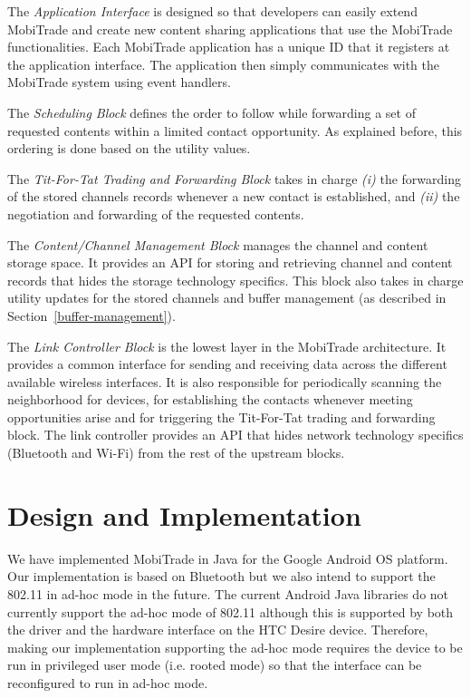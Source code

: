 The \textit{Application Interface} is designed so that developers can easily extend MobiTrade and create new content sharing applications that use the MobiTrade functionalities. Each MobiTrade application has a unique ID that it registers at the application interface. The application then simply communicates with the MobiTrade system using event handlers.

The \textit{Scheduling Block} defines the order to follow while forwarding a set of requested contents within a limited contact opportunity. As explained before, this ordering is done based on the utility values.

The \textit{Tit-For-Tat Trading and Forwarding Block} takes in charge \emph{(i)} the forwarding of the stored channels records whenever a new contact is established, and \emph{(ii)} the negotiation and forwarding of the requested contents.

The \textit{Content/Channel Management Block} manages the channel and content storage space. It provides an API for storing and retrieving channel and content records that hides the storage technology specifics. This block also takes in charge utility updates for the stored channels and buffer management (as described in Section~\ref{buffer-management}).

The \textit{Link Controller Block} is the lowest layer in the MobiTrade architecture. It provides a common interface for sending and receiving data across the different available wireless interfaces. It is also responsible for periodically scanning the neighborhood for devices, for establishing the contacts whenever meeting opportunities arise and for triggering the Tit-For-Tat trading and forwarding block. The link controller provides an API that hides network technology specifics (Bluetooth and Wi-Fi) from the rest of the upstream blocks.


\section{Design and Implementation}
\label{MobiTradeDesignAndImplementation}

We have implemented MobiTrade in Java for the Google Android OS platform. Our implementation is based on Bluetooth but we also intend to support the 802.11 in ad-hoc mode in the future. The current Android Java libraries do not currently support the ad-hoc mode of 802.11 although this is supported by both the driver and the hardware interface on the HTC Desire device. Therefore, making our implementation supporting the ad-hoc mode requires the device to be run in privileged user mode (i.e. rooted mode) so that the interface can be reconfigured to run in ad-hoc mode.



